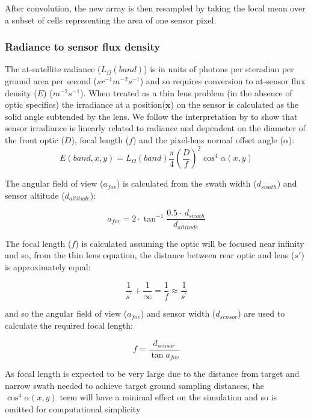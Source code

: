 \documentclass[10pt,a4paper,final,onecolumn]{article}
\begin{document}
After convolution, the new array is then resampled by taking the local mean over a subset of cells representing the area of one sensor pixel.

\subsubsection{Radiance to sensor flux density}
The at-satellite radiance ($L_{\Omega}(band)$) is in units of photons per steradian per ground area per second ($sr^{-1} m^{-2} s^{-1}$) and so requires conversion to at-sensor flux density ($E$) ($m^{-2} s^{-1}$). When treated as a thin lens problem (in the absence of optic specifics) the irradiance at a position($\textbf{x}$) on the sensor is calculated as the solid angle subtended by the lens. We follow the interpretation by \cite{Sato1999} to show that sensor irradiance is linearly related to radiance and dependent on the diameter of the front optic ($D$), focal length ($f$) and the pixel-lens normal offset angle ($\alpha$):
\begin{equation}
E(band, x, y) = L_{\Omega}(band) \frac{\pi}{4} \left(\frac{D}{f}\right)^{2} \cos^4 \alpha(x,y)
\label{eqn1}
\end{equation}

The angular field of view ($a_{fov}$) is calculated from the swath width ($d_{swath}$) and sensor altitude ($d_{altitude}$):

\begin{equation}
a_{fov} = 2\cdot \tan^{-1}\frac{0.5\cdot~d_{swath}}{d_{altitude}}
\end{equation}

The focal length ($f$) is calculated assuming the optic will be focused near infinity and so, from the thin lens equation, the distance between rear optic and lens ($s\prime$) is approximately equal:

\begin{equation}
\frac{1}{s^\prime} + \frac{1}{\infty} = \frac{1}{f} \approx \frac{1}{s^\prime}
\end{equation}

and so the angular field of view ($a_{fov}$) and sensor width ($d_{sensor}$) are used to calculate the required focal length:

\begin{equation}
f= \frac{d_{sensor}}{\tan a_{fov}}
\end{equation}

As focal length is expected to be very large due to the distance from target and narrow swath needed to achieve target ground sampling distances, the $\cos^4\alpha(x, y)$ term will have a minimal effect on the simulation and so is omitted for computational simplicity
\end{document}

